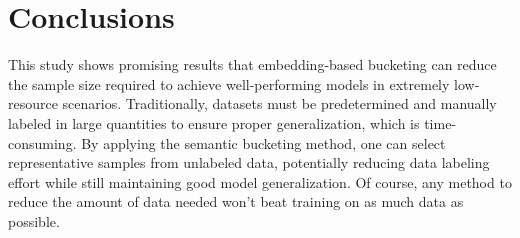 \documentclass[twocolumn]{article}
\newcounter{ex}
\renewcommand{\indent}{\hspace*{2em}}
\begin{document}
\section{Conclusions}\label{conclusions}
\indent This study shows promising results that embedding-based bucketing can reduce the sample size required to achieve well-performing models in extremely low-resource scenarios. Traditionally, datasets must be predetermined and manually labeled in large quantities to ensure proper generalization, which is time-consuming. By applying the semantic bucketing method, one can select representative samples from unlabeled data, potentially reducing data labeling effort while still maintaining good model generalization. Of course, any method to reduce the amount of data needed won't beat training on as much data as possible.

\begin{table}[H]
\centering
\caption{Sizes of clusters after HDBSCAN clustering. The noise bucket, containing points not assigned to any cluster, is indexed as -1.}
\label{tab:bucket-sizes}
\end{table}

\begin{table}[H]
\centering
\caption{Hierarchical Data Split for Bucket 2 (4767 samples)}
\label{tab:bucket2-split}
\end{table}
\end{document}
